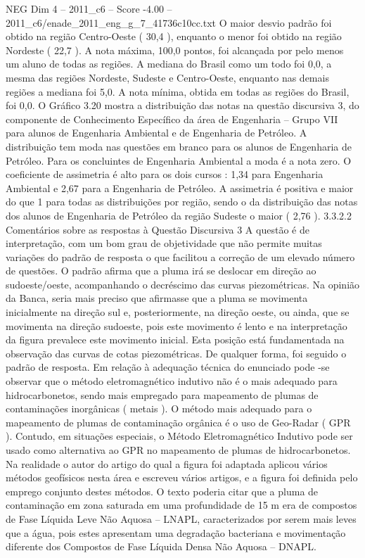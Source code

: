 \begin{textsample}{NEG Dim 4 – 2011\_c6 – Score -4.00 – 2011\_c6/enade\_2011\_eng\_g\_7\_41736c10cc.txt}
O maior desvio padrão foi obtido na região Centro-Oeste ( 30,4 ), enquanto o menor foi obtido na região Nordeste ( 22,7 ).
A nota máxima, 100,0 pontos, foi alcançada por pelo menos um aluno de todas as regiões.
A mediana do Brasil como um todo foi 0,0, a mesma das regiões Nordeste, Sudeste e Centro-Oeste, enquanto nas demais regiões a mediana foi 5,0.
A nota mínima, obtida em todas as regiões do Brasil, foi 0,0.
O Gráfico 3.20 mostra a distribuição das notas na questão discursiva 3, do componente de Conhecimento Específico da área de Engenharia – Grupo VII para alunos de Engenharia Ambiental e de Engenharia de Petróleo.
A distribuição tem moda nas questões em branco para os alunos de Engenharia de Petróleo.
Para os concluintes de Engenharia Ambiental a moda é a nota zero.
O coeficiente de assimetria é alto para os dois cursos : 1,34 para Engenharia Ambiental e 2,67 para a Engenharia de Petróleo.
A assimetria é positiva e maior do que 1 para todas as distribuições por região, sendo o da distribuição das notas dos alunos de Engenharia de Petróleo da região Sudeste o maior ( 2,76 ). 3.3.2.2 Comentários sobre as respostas à Questão Discursiva 3 A questão é de interpretação, com um bom grau de objetividade que não permite muitas variações do padrão de resposta o que facilitou a correção de um elevado número de questões.
O padrão afirma que a pluma irá se deslocar em direção ao sudoeste/oeste, acompanhando o decréscimo das curvas piezométricas.
Na opinião da Banca, seria mais preciso que afirmasse que a pluma se movimenta inicialmente na direção sul e, posteriormente, na direção oeste, ou ainda, que se movimenta na direção sudoeste, pois este movimento é lento e na interpretação da figura prevalece este movimento inicial.
Esta posição está fundamentada na observação das curvas de cotas piezométricas.
De qualquer forma, foi seguido o padrão de resposta.
Em relação à adequação técnica do enunciado pode -se observar que o método eletromagnético indutivo não é o mais adequado para hidrocarbonetos, sendo mais empregado para mapeamento de plumas de contaminações inorgânicas ( metais ).
O método mais adequado para o mapeamento de plumas de contaminação orgânica é o uso de Geo-Radar ( GPR ).
Contudo, em situações especiais, o Método Eletromagnético Indutivo pode ser usado como alternativa ao GPR no mapeamento de plumas de hidrocarbonetos.
Na realidade o autor do artigo do qual a figura foi adaptada aplicou vários métodos geofísicos nesta área e escreveu vários artigos, e a figura foi definida pelo emprego conjunto destes métodos.
O texto poderia citar que a pluma de contaminação em zona saturada em uma profundidade de 15 m era de compostos de Fase Líquida Leve Não Aquosa – LNAPL, caracterizados por serem mais leves que a água, pois estes apresentam uma degradação bacteriana e movimentação diferente dos Compostos de Fase Líquida Densa Não Aquosa – DNAPL.

\end{textsample}
